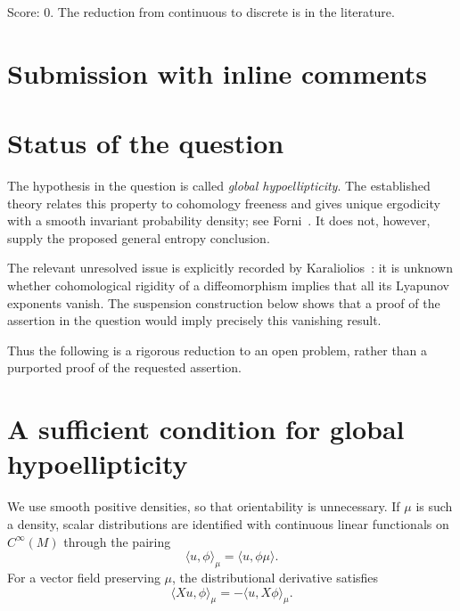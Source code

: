 \documentclass[11pt]{article}
\theoremstyle{definition}
\theoremstyle{remark}
\begin{document}
\noindent Score: 0.
The reduction from continuous to discrete is in the literature.

\newpage
\section{Submission with inline comments}


\begin{abstract}
A complete proof of the proposed assertion is not known in the stated
generality. In fact, the assertion would settle the open problem of
vanishing Lyapunov exponents for cohomologically rigid diffeomorphisms.
We give a complete proof of this reduction, explaining why the usual
structural results about globally hypoelliptic vector fields do not
supply the requested conclusion.
\end{abstract}

\section{Status of the question}

The hypothesis in the question is called \emph{global hypoellipticity}.
The established theory relates this property to cohomology freeness and
gives unique ergodicity with a smooth invariant probability density;
see Forni~\cite[Proposition~2.4 and Theorem~3.10]{Forni}.
It does not, however, supply the proposed general entropy conclusion.

The relevant unresolved issue is explicitly recorded by
Karaliolios~\cite[Introduction, p.~6]{Karaliolios}: it is unknown whether
cohomological rigidity of a diffeomorphism implies that all its Lyapunov
exponents vanish. The suspension construction below shows that a proof
of the assertion in the question would imply precisely this vanishing
result.

Thus the following is a rigorous reduction to an open problem, rather
than a purported proof of the requested assertion.

\section{A sufficient condition for global hypoellipticity}

We use smooth positive densities, so that orientability is unnecessary.
If $\mu$ is such a density, scalar distributions are identified with
continuous linear functionals on $C^\infty(M)$ through the pairing
\[
 \langle u,\phi\rangle_\mu
 =
 \langle u,\phi\mu\rangle.
\]
For a vector field preserving $\mu$, the distributional derivative
satisfies
\[
 \langle Xu,\phi\rangle_\mu
 =
 -\langle u,X\phi\rangle_\mu.
\]
\end{document}
